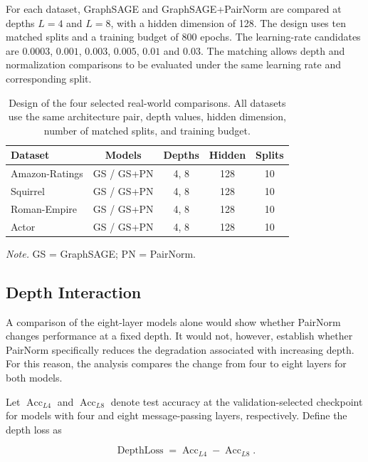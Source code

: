 \documentclass[english]{lni}
\begin{document}
For each dataset, GraphSAGE and GraphSAGE+PairNorm are compared at depths $L=4$ and $L=8$, with a hidden dimension of 128. The design uses ten matched splits and a training budget of 800 epochs. The learning-rate candidates are $0.0003$, $0.001$, $0.003$, $0.005$, $0.01$ and $0.03$. The matching allows depth and normalization comparisons to be evaluated under the same learning rate and corresponding split.

\begin{table}[htbp]
\centering
\caption{Design of the four selected real-world comparisons. All datasets use the same architecture pair, depth values, hidden dimension, number of matched splits, and training budget.}
\label{tab:selected-design}
\small
\begin{tabular}{lcccc}
\toprule
Dataset & Models & Depths & Hidden & Splits\\
\midrule
Amazon-Ratings & GS / GS+PN & 4, 8 & 128 & 10\\
Squirrel & GS / GS+PN & 4, 8 & 128 & 10\\
Roman-Empire & GS / GS+PN & 4, 8 & 128 & 10\\
Actor & GS / GS+PN & 4, 8 & 128 & 10\\
\bottomrule
\end{tabular}

\smallskip
\parbox{\linewidth}{\footnotesize
\textit{Note.} GS = GraphSAGE; PN = PairNorm.}
\end{table}

\subsection{Depth Interaction}
\label{sec:selected-depth-interaction}

A comparison of the eight-layer models alone would show whether PairNorm changes performance at a fixed depth. It would not, however, establish whether PairNorm specifically reduces the degradation associated with increasing depth. For this reason, the analysis compares the change from four to eight layers for both models.

Let $\operatorname{Acc}_{L4}$ and $\operatorname{Acc}_{L8}$ denote test accuracy at the validation-selected checkpoint for models with four and eight message-passing layers, respectively. Define the depth loss as

\begin{equation}
\operatorname{DepthLoss}
=
\operatorname{Acc}_{L4}
-
\operatorname{Acc}_{L8}.
\label{eq:depth-loss}
\end{equation}
\end{document}
